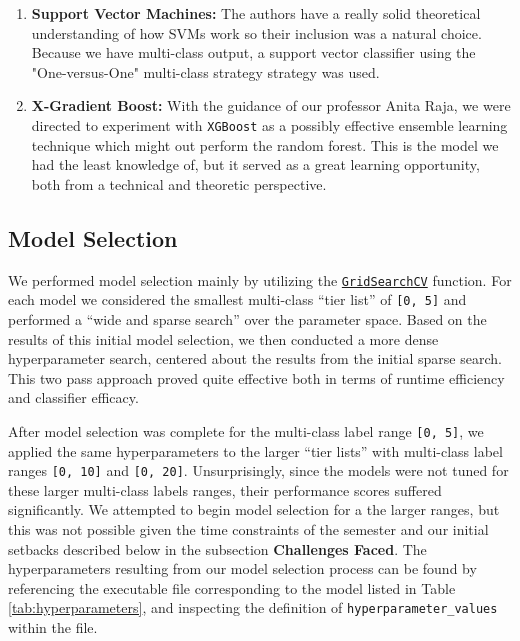 \documentclass[12pt]{diazessay}
\begin{document}
\begin{enumerate}
\item
  \textbf{Support Vector Machines:} The authors have a really solid
  theoretical understanding of how SVMs work so their inclusion was a
  natural choice. Because we have multi-class output, a support vector
  classifier using the "One-versus-One" multi-class strategy strategy was
  used.
\item
  \textbf{X-Gradient Boost:} With the guidance of our professor Anita
  Raja, we were directed to experiment with \texttt{XGBoost} as a
  possibly effective ensemble learning technique which might out perform
  the random forest. This is the model we had the least knowledge of,
  but it served as a great learning opportunity, both from a technical
  and theoretic perspective.
\end{enumerate}

\hypertarget{model-selection}{%
\subsection{Model Selection}\label{model-selection}}

We performed model selection mainly by utilizing the \href{https://scikit-learn.org/stable/modules/generated/sklearn.model_selection.GridSearchCV.html}{\texttt{GridSearchCV}} function.
For each model we considered the smallest multi-class ``tier list'' of \texttt{[0, 5]} and performed a ``wide and sparse search'' over the parameter space.
Based on the results of this initial model selection, we then conducted a more dense hyperparameter search, centered about the results from the initial sparse search.
This two pass approach proved quite effective both in terms of runtime efficiency and classifier efficacy.

After model selection was complete for the multi-class label range \texttt{[0, 5]}, we applied the same hyperparameters to the larger ``tier lists'' with multi-class label ranges \texttt{[0, 10]} and \texttt{[0, 20]}.
Unsurprisingly, since the models were not tuned for these larger multi-class labels ranges, their performance scores suffered significantly.
We attempted to begin model selection for a the larger ranges, but this was not possible given the time constraints of the semester and our initial setbacks described below in the subsection \textbf{Challenges Faced}.
The hyperparameters resulting from our model selection process can be found by referencing the executable file corresponding to the model listed in Table \ref{tab:hyperparameters}, and inspecting the definition of \texttt{hyperparameter\_values} within the file.
\end{document}
